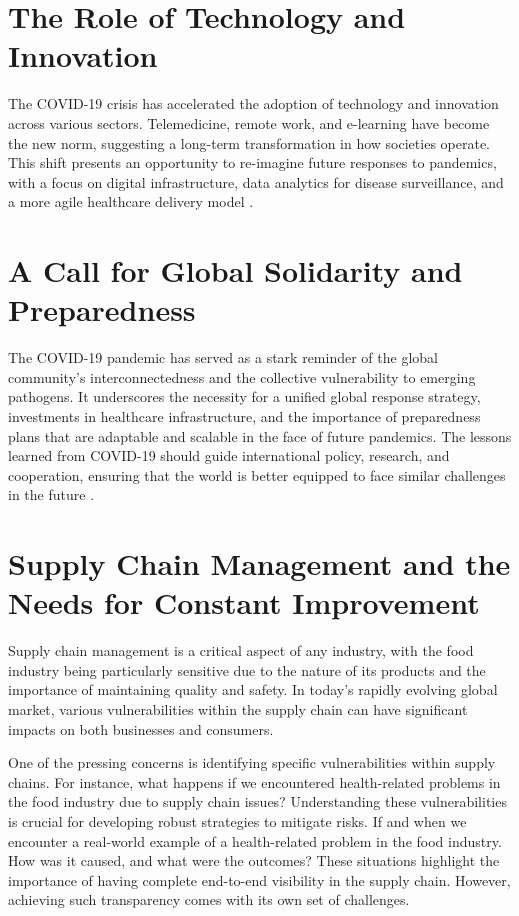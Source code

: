 \section{The Role of Technology and Innovation}

The COVID-19 crisis has accelerated the adoption of technology and innovation across various sectors. Telemedicine, remote work, and e-learning have become the new norm, suggesting a long-term transformation in how societies operate. This shift presents an opportunity to re-imagine future responses to pandemics, with a focus on digital infrastructure, data analytics for disease surveillance, and a more agile healthcare delivery model \parencite{Shrestha2020TheGlobalization, MaitalEllaBarzani2020EResearch}.

\section{A Call for Global Solidarity and Preparedness}

The COVID-19 pandemic has served as a stark reminder of the global community's interconnectedness and the collective vulnerability to emerging pathogens. It underscores the necessity for a unified global response strategy, investments in healthcare infrastructure, and the importance of preparedness plans that are adaptable and scalable in the face of future pandemics. The lessons learned from COVID-19 should guide international policy, research, and cooperation, ensuring that the world is better equipped to face similar challenges in the future \parencite{Verma2021AReturns, Shrestha2020TheGlobalization, LegeseFeyisa2020TheReview, MaitalEllaBarzani2020EResearch}.

\section{Supply Chain Management and the Needs for Constant Improvement}

Supply chain management is a critical aspect of any industry, with the food industry being particularly sensitive due to the nature of its products and the importance of maintaining quality and safety. In today’s rapidly evolving global market, various vulnerabilities within the supply chain can have significant impacts on both businesses and consumers.

One of the pressing concerns is identifying specific vulnerabilities within supply chains. For instance, what happens if we encountered health-related problems in the food industry due to supply chain issues? Understanding these vulnerabilities is crucial for developing robust strategies to mitigate risks. If and when we encounter a real-world example of a health-related problem in the food industry. How was it caused, and what were the outcomes? These situations highlight the importance of having complete end-to-end visibility in the supply chain. However, achieving such transparency comes with its own set of challenges\parencite{Wagner2006AnVulnerability, Elleuch2016ResilienceReview}.

